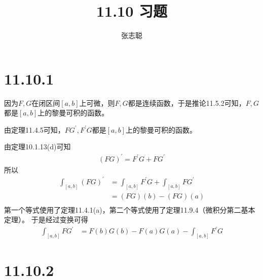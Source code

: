 \documentclass{article}
\begin{document}
\title{11.10 习题}
\author{张志聪}
\maketitle

\section*{11.10.1}

因为$F, G$在闭区间$[a, b]$上可微，则$F, G$都是连续函数，于是推论11.5.2可知，$F, G$都是$[a, b]$上的黎曼可积的函数。

由定理11.4.5可知，$F G^\prime, F^\prime G$都是$[a, b]$上的黎曼可积的函数。

由定理10.1.13(d)可知
\begin{align*}
  (FG)^\prime = F^\prime G + F G^\prime
\end{align*}
所以
\begin{align*}
  \int_{[a, b]} (FG)^\prime & = \int_{[a, b]} F^\prime G + \int_{[a, b]} F G^\prime \\
                            & = (FG)(b) - (FG)(a)                                   \\
\end{align*}
第一个等式使用了定理11.4.1(a)，第二个等式使用了定理11.9.4（微积分第二基本定理）。
于是经过变换可得
\begin{align*}
  \int_{[a, b]} FG^\prime & = F(b)G(b) - F(a)G(a) - \int_{[a, b]} F^\prime G
\end{align*}

\section*{11.10.2}
\end{document}
